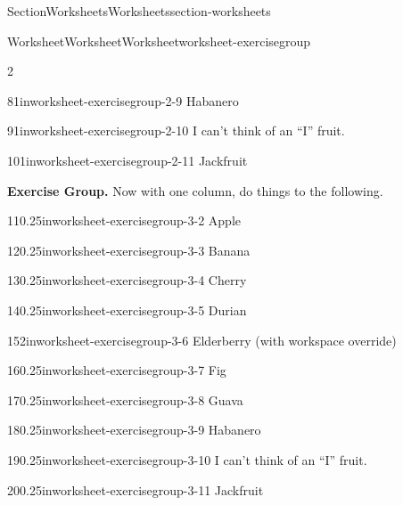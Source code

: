 \documentclass[twoside,10pt,]{article}
\numberwithin{equation}{section}
\begin{document}
\begin{sectionptx}{Section}{Worksheets}{}{Worksheets}{}{}{section-worksheets}
\begin{worksheet-subsection}{Worksheet}{Worksheet}{}{Worksheet}{}{}{worksheet-exercisegroup}
\begin{exercisegroupcol}{2}
\begin{divisionexerciseegcol}{8}{}{1in}{worksheet-exercisegroup-2-9}%
Habanero%
\end{divisionexerciseegcol}%
\begin{divisionexerciseegcol}{9}{}{1in}{worksheet-exercisegroup-2-10}%
I can't think of an ``I'' fruit.%
\end{divisionexerciseegcol}%
\begin{divisionexerciseegcol}{10}{}{1in}{worksheet-exercisegroup-2-11}%
Jackfruit%
\end{divisionexerciseegcol}%
\end{exercisegroupcol}
\par\medskip\noindent
\par\medskip\noindent%
\textbf{Exercise Group.}\space\space%
Now with one column, do things to the following.%
\begin{exercisegroup}
\begin{divisionexerciseeg}{11}{}{0.25in}{worksheet-exercisegroup-3-2}%
Apple%
\end{divisionexerciseeg}%
\begin{divisionexerciseeg}{12}{}{0.25in}{worksheet-exercisegroup-3-3}%
Banana%
\end{divisionexerciseeg}%
\begin{divisionexerciseeg}{13}{}{0.25in}{worksheet-exercisegroup-3-4}%
Cherry%
\end{divisionexerciseeg}%
\begin{divisionexerciseeg}{14}{}{0.25in}{worksheet-exercisegroup-3-5}%
Durian%
\end{divisionexerciseeg}%
\begin{divisionexerciseeg}{15}{}{2in}{worksheet-exercisegroup-3-6}%
Elderberry (with workspace override)%
\end{divisionexerciseeg}%
\begin{divisionexerciseeg}{16}{}{0.25in}{worksheet-exercisegroup-3-7}%
Fig%
\end{divisionexerciseeg}%
\begin{divisionexerciseeg}{17}{}{0.25in}{worksheet-exercisegroup-3-8}%
Guava%
\end{divisionexerciseeg}%
\begin{divisionexerciseeg}{18}{}{0.25in}{worksheet-exercisegroup-3-9}%
Habanero%
\end{divisionexerciseeg}%
\begin{divisionexerciseeg}{19}{}{0.25in}{worksheet-exercisegroup-3-10}%
I can't think of an ``I'' fruit.%
\end{divisionexerciseeg}%
\begin{divisionexerciseeg}{20}{}{0.25in}{worksheet-exercisegroup-3-11}%
Jackfruit%
\end{divisionexerciseeg}%
\end{exercisegroup}
\par\medskip\noindent
\end{worksheet-subsection}
\restoregeometry
\end{sectionptx}
\end{document}
